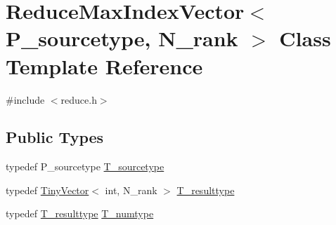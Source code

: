 \hypertarget{classReduceMaxIndexVector}{}\section{Reduce\+Max\+Index\+Vector$<$ P\+\_\+sourcetype, N\+\_\+rank $>$ Class Template Reference}
\label{classReduceMaxIndexVector}


{\ttfamily \#include $<$reduce.\+h$>$}

\subsection*{Public Types}
\begin{DoxyCompactItemize}
\item 
typedef P\+\_\+sourcetype \hyperlink{classReduceMaxIndexVector_a959c30c0e834ac3a1f5c2a85e3f8521e}{T\+\_\+sourcetype}
\item 
typedef \hyperlink{classTinyVector}{Tiny\+Vector}$<$ int, N\+\_\+rank $>$ \hyperlink{classReduceMaxIndexVector_aa692334e6c8dff5065b896773e77eac8}{T\+\_\+resulttype}
\item 
typedef \hyperlink{classReduceMaxIndexVector_aa692334e6c8dff5065b896773e77eac8}{T\+\_\+resulttype} \hyperlink{classReduceMaxIndexVector_aa1139b968fabe9c7696c31579e7faab0}{T\+\_\+numtype}
\end{DoxyCompactItemize}
